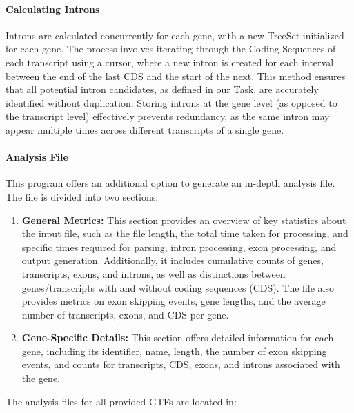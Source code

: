 \documentclass{article}
\begin{document}
    \paragraph{Calculating Introns}
    Introns are calculated concurrently for each gene, with a new TreeSet initialized for each gene. The process involves iterating through the Coding Sequences of each transcript using a cursor, where a new intron is created for each interval between the end of the last CDS and the start of the next. This method ensures that all potential intron candidates, as defined in our Task, are accurately identified without duplication. Storing introns at the gene level (as opposed to the transcript level) effectively prevents redundancy, as the same intron may appear multiple times across different transcripts of a single gene.

    \paragraph{Analysis File} This program offers an additional option to generate an in-depth analysis file. The file is divided into two sections:
    \begin{enumerate}
        \item \textbf{General Metrics:} This section provides an overview of key statistics about the input file, such as the file length, the total time taken for processing, and specific times required for parsing, intron processing, exon processing, and output generation. Additionally, it includes cumulative counts of genes, transcripts, exons, and introns, as well as distinctions between genes/transcripts with and without coding sequences (CDS). The file also provides metrics on exon skipping events, gene lengths, and the average number of transcripts, exons, and CDS per gene.
        \item \textbf{Gene-Specific Details:} This section offers detailed information for each gene, including its identifier, name, length, the number of exon skipping events, and counts for transcripts, CDS, exons, and introns associated with the gene.
    \end{enumerate}
    The analysis files for all provided GTFs are located in:\\
\end{document}

